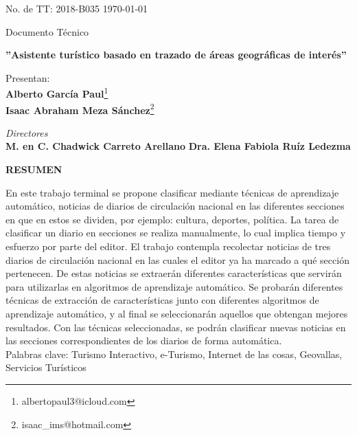 \begin{titlepage}
\noindent
	\Large No. de TT: 2018-B035  \hfill \large \today \\%

\begin{center}
	\Large Documento Técnico\\[0.7cm]
\end{center}

\begin{center}
	\textbf{\Large ''Asistente turístico basado en trazado de áreas geográficas de interés''}\\[0.7cm]
\end{center}

\begin{center}
	\Large Presentan:\\[0.3cm]
	\textbf{Alberto García Paul}\footnote{albertopaul3@icloud.com}\\[0.2cm]
	\textbf{Isaac Abraham Meza Sánchez}\footnote{isaac\_ims@hotmail.com}\\[0.8cm]
\end{center}

\begin{center}
	\textit{\Large Directores} \\[0.3cm]
	\textbf{M. en C. Chadwick Carreto Arellano} \qquad\qquad  \textbf{Dra. Elena Fabiola Ruíz Ledezma}\\[0.8cm]
\end{center}

\begin{center}
	{\Large \textbf{RESUMEN}}\\[0.2cm]
\end{center}
{\setlength{\parindent}{0pt}
En este trabajo terminal se propone clasificar mediante técnicas de aprendizaje automático,
noticias de diarios de circulación nacional en las diferentes secciones en que en estos se
dividen, por ejemplo: cultura, deportes, política. La tarea de clasificar un diario en secciones se
realiza manualmente, lo cual implica tiempo y esfuerzo por parte del editor.
El trabajo contempla recolectar noticias de tres diarios de circulación nacional en las cuales el
editor ya ha marcado a qué sección pertenecen. De estas noticias se extraerán diferentes
características que servirán para utilizarlas en algoritmos de aprendizaje automático. Se
probarán diferentes técnicas de extracción de características junto con diferentes algoritmos de
aprendizaje automático, y al final se seleccionarán aquellos que obtengan mejores resultados.
Con las técnicas seleccionadas, se podrán clasificar nuevas noticias en las secciones
correspondientes de los diarios de forma automática.\\[0.5CM]
Palabras clave: Turismo Interactivo, e-Turismo, Internet de las cosas, Geovallas, Servicios Turísticos

}
\end{titlepage}
